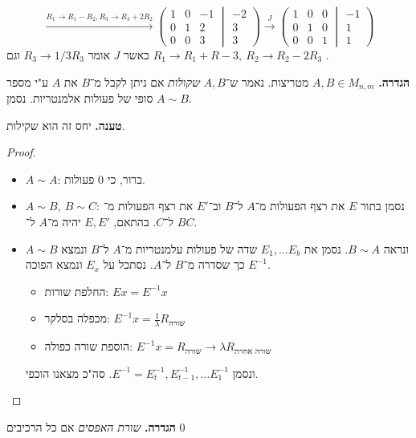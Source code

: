 \documentclass[]{article}
\newcommand\op    {^{-1}}
\newcommand\cl [1]    {\left ( #1 \right )}
\begin{document}
	\[ \overset{R_1 \to R_1 - R_2, R_3 \to R_3 + 2R_2}{\to} \cl{\begin{matrix}
			1 & 0 & -1 \\
			0 & 1 & 2 \\
			0 & 0 & 3
	\end{matrix}\middle\vert\begin{matrix}
	-2 \\ 3 \\ 3
	\end{matrix}} \overset{J}{\to} \cl{\begin{matrix}
	1 & 0 & 0 \\
	0 & 1 & 0\\
	0 & 0 &1
	\end{matrix}\middle\vert\begin{matrix}
	-1 \\ 1\\1
	\end{matrix}}
	 \]
	 כאשר $J$ אומר $R_3 \to 1 / 3R_3$ וגם $R_1 \to R_1 + R-3, \ R_2 \to R_2 - 2R_3$ . 
	 
	 \textbf{הגדרה. }$A, B \in M_{n, m}$ מטריצות. נאמר ש־$A, B$ \textit{שקולות} אם ניתן לקבל מ־$B$ את $A$ ע"י מספר סופי של פעולות אלמנטריות. נסמן $A \sim B$. 
	 
	 \textbf{טענה. }יחס זה הוא שקילות. 
	\begin{proof}\ 
		\begin{itemize}
			\item $A \sim A$: ברור, כי 0 פעולות. 
			\item $A \sim B, \ B \sim C$: נסמן בתור $E$ את רצף הפעולות מ־$A$ ל־$B$ וב־$E'$ את רצף הפעולות מ־$B$ ל־$C$. בהתאם, $E, E'$ יהיה מ־$A$ ל־$C$. 
			\item $A \sim B$ ונראה $B \sim A$. נסמן את $E_1, \dots E_b$ שדה של פעולות עלמנטריות מ־$A$ ל־$B$ ונמצא $E\op$ כך שסדרה מ־$B$ ל־$A$. נסתכל על $E_x$ ונמצא הפוכה. 
			\begin{itemize}
				\item החלפת שורות: $Ex = E\op x$
				\item מכפלה בסלקר: $E\op x = \frac{1}{\lambda}R_{\text{שורה}}$
				\item הוספת שורה כפולה:
				$E\op x = R_{\text{שורה}} \to \lambda R_{\text{שורה אחרת}}$
			\end{itemize}
			ונסמן $E\op = E\op_t, E\op_{t - 1}, \dots E\op_1$. סה"כ מצאנו הוכפי. 
		\end{itemize}
	\end{proof}
	
	\textbf{הגדרה. }\textit{שורת האפסים} אם כל הרכיבים  $0$
	
\end{document}
